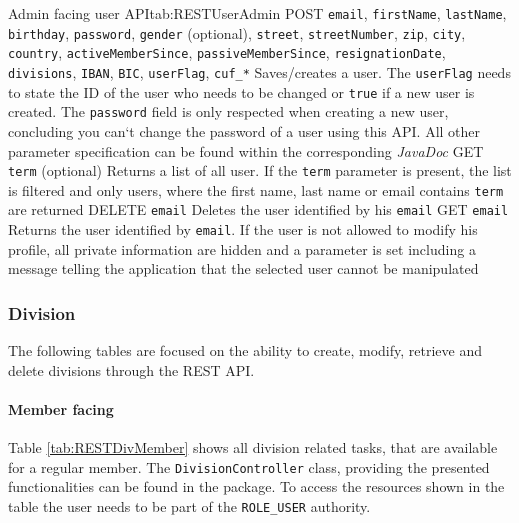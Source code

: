 \begin{RESTTable}{Admin facing user API}{tab:RESTUserAdmin}
		{POST}
		{\texttt{email}, \texttt{firstName}, \texttt{lastName}, \texttt{birthday}, \texttt{password}, \texttt{gender} (optional), \texttt{street}, \texttt{streetNumber}, \texttt{zip}, \texttt{city}, \texttt{country}, \texttt{activeMemberSince}, \texttt{passiveMemberSince}, \texttt{resignationDate}, \texttt{divisions}, \texttt{IBAN}, \texttt{BIC}, \texttt{userFlag}, \texttt{cuf\_*}} 
		{Saves/creates a user. The \texttt{userFlag} needs to state the ID of the user who needs to be changed or \texttt{true} if a new user is created. The \texttt{password} field is only respected when creating a new user, concluding you can`t change the password of a user using this API. All other parameter specification can be found within the corresponding \emph{JavaDoc}}
		{GET}
		{\texttt{term} (optional)} 
		{Returns a list of all user. If the \texttt{term} parameter is present, the list is filtered and only users, where the first name, last name or email contains \texttt{term} are returned}
		{DELETE}
		{\texttt{email}}
		{Deletes the user identified by his \texttt{email}}
		{GET}
		{\texttt{email}}
		{Returns the user identified by \texttt{email}. If the user is not allowed to modify his profile, all private information are hidden and a parameter is set including a message telling the application that the selected user cannot be manipulated}
\end{RESTTable}

\subsubsection{Division}
The following tables are focused on the ability to create, modify, retrieve and delete divisions through the \gls{REST} {API}.

\paragraph{Member facing}
Table \vref{tab:RESTDivMember} shows all division related tasks, that are available for a regular member. The \texttt{DivisionController} class, providing the presented functionalities can be found in the  package. To access the resources shown in the table the user needs to be part of the \texttt{ROLE\_USER} authority.

